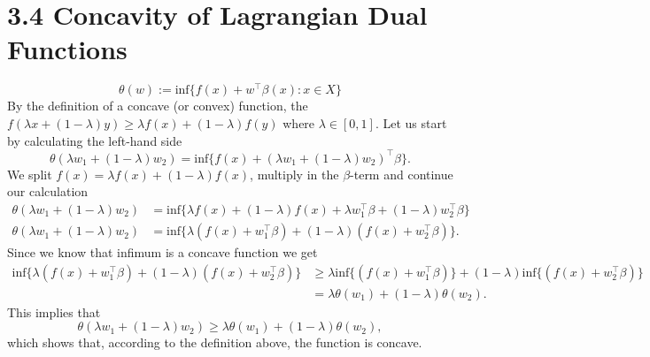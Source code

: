\documentclass{article}
\begin{document}
\section*{3.4 Concavity of Lagrangian Dual Functions}
	\begin{equation}
		\theta(w) := \text{inf} \{f(x) + w^\top\beta(x): x\in X\}
	\end{equation}
	By the definition of a concave (or convex) function, the $f(\lambda x + (1-\lambda)y) \geq \lambda f(x) + (1-\lambda) f(y)$ where $\lambda \in [0,1]$. Let us start by calculating the left-hand side
	\begin{equation}
		\theta(\lambda w_1 + (1-\lambda)w_2) = \text{inf}\{f(x) + (\lambda w_1 + (1-\lambda)w_2)^\top \beta\}.
	\end{equation}
	We split $f(x) = \lambda f(x) + (1-\lambda)f(x)$, multiply in the $\beta$-term and continue our calculation
	\begin{align}
		\theta(\lambda w_1 + (1-\lambda)w_2) &= \text{inf}\{\lambda f(x) + (1-\lambda)f(x) + \lambda w_1^\top \beta + (1-\lambda)w_2^\top \beta\}\\
		\theta(\lambda w_1 + (1-\lambda)w_2) &= \text{inf}\{\lambda (f(x)+w_1^\top \beta) +(1-\lambda)(f(x)+w_2^\top \beta) \}.
	\end{align}
	Since we know that infimum is a concave function we get
	\begin{align}
		\text{inf}\{\lambda (f(x)+w_1^\top \beta) +(1-\lambda)(f(x)+w_2^\top \beta) \} &\geq \lambda\text{inf}\{ (f(x)+w_1^\top \beta)\} +(1-\lambda)\text{inf}\{(f(x)+w_2^\top \beta)\}\\
		&=\lambda \theta(w_1) + (1-\lambda)\theta(w_2).
	\end{align}
	This implies that 
	\begin{equation}
		\theta(\lambda w_1 + (1-\lambda)w_2) \geq \lambda \theta(w_1) + (1-\lambda)\theta(w_2),
	\end{equation}
	which shows that, according to the definition above, the function is concave.
\end{document}
